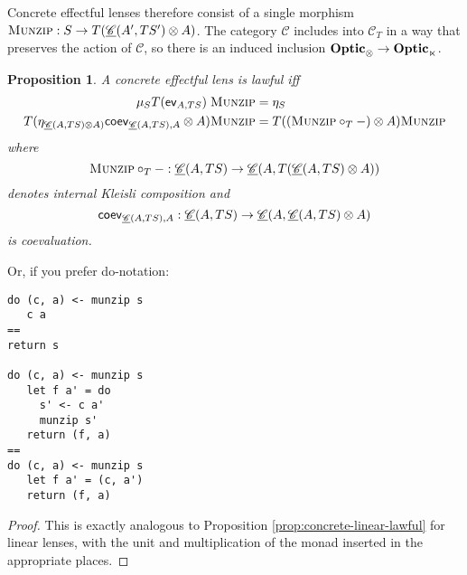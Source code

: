 \documentclass[11pt,a4paper]{article}
\theoremstyle{plain}
\newtheorem{proposition}[theorem]{Proposition}
\theoremstyle{definition}
\newcommand{\C}{\mathscr{C}}
\newcommand{\homC}{\underline{\C}}
\newcommand{\Optic}{\mathbf{Optic}}
\newcommand{\munzip}{\textsc{Munzip}}
\begin{document}
Concrete effectful lenses therefore consist of a single morphism $\munzip : S \to T(\homC(A', T S') \otimes A)$. The category $\C$ includes into $\C_T$ in a way that preserves the action of $\C$, so there is an induced inclusion $\Optic_\otimes \to \Optic_\monact$.

\begin{proposition}
A concrete effectful lens is lawful iff
  \begin{align*}
    \mu_S T(\ev_{A, TS}) \; \munzip &= \eta_S \\
    T(\eta_{\homC(A, TS) \otimes A)}\coev_{\homC(A, TS), A} \otimes A)\munzip &= T((\munzip \circ_T -) \otimes A)\munzip 
  \end{align*}
  where \[ \munzip \circ_T - : \homC(A, TS) \to \homC(A, T(\homC(A, TS) \otimes A)) \] denotes internal Kleisli composition and \[\coev_{\homC(A, TS), A} : \homC(A, TS) \to \homC(A, \homC(A, TS) \otimes A) \] is coevaluation.
\end{proposition}
  Or, if you prefer do-notation:
\begin{verbatim}
do (c, a) <- munzip s
   c a
== 
return s

do (c, a) <- munzip s
   let f a' = do
     s' <- c a'
     munzip s'
   return (f, a)
==
do (c, a) <- munzip s
   let f a' = (c, a')
   return (f, a)
\end{verbatim}
\begin{proof}
This is exactly analogous to Proposition \ref{prop:concrete-linear-lawful} for linear lenses, with the unit and multiplication of the monad inserted in the appropriate places.
\end{proof}
\end{document}
